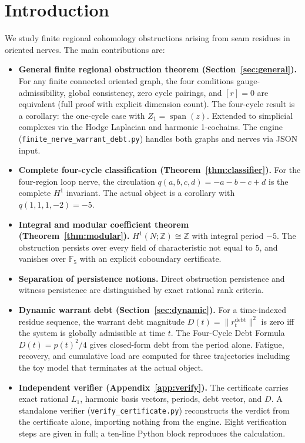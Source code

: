 \documentclass[11pt]{article}
\begin{document}
\section{Introduction}
We study finite regional cohomology obstructions arising from seam residues in
oriented nerves. The main contributions are:
\begin{itemize}
  \item \textbf{General finite regional obstruction theorem
    (Section~\ref{sec:general}).}
    For any finite connected oriented graph, the four conditions
    gauge-admissibility, global consistency, zero cycle pairings, and $[r]=0$
    are equivalent (full proof with explicit dimension count). The four-cycle
    result is a corollary: the one-cycle case with $Z_1=\operatorname{span}(z)$.
    Extended to simplicial complexes via the Hodge Laplacian and harmonic
    1-cochains. The engine (\texttt{finite\_nerve\_warrant\_debt.py}) handles
    both graphs and nerves via JSON input.
  \item \textbf{Complete four-cycle classification (Theorem~\ref{thm:classifier}).}
    For the four-region loop nerve, the circulation $q(a,b,c,d)=-a-b-c+d$ is
    the complete $H^1$ invariant. The actual object is a corollary with
    $q(1,1,1,-2)=-5$.
  \item \textbf{Integral and modular coefficient theorem (Theorem~\ref{thm:modular}).}
    $H^1(N;\mathbb{Z})\cong\mathbb{Z}$ with integral period $-5$. The obstruction
    persists over every field of characteristic not equal to $5$, and vanishes
    over $\mathbb{F}_5$ with an explicit coboundary certificate.
  \item \textbf{Separation of persistence notions.} Direct obstruction persistence
    and witness persistence are distinguished by exact rational rank criteria.
  \item \textbf{Dynamic warrant debt (Section~\ref{sec:dynamic}).}
    For a time-indexed residue sequence, the warrant debt magnitude
    $D(t)=\|r_t^{\mathrm{debt}}\|^2$ is zero iff the system is globally
    admissible at time $t$. The Four-Cycle Debt Formula $D(t)=p(t)^2/4$ gives
    closed-form debt from the period alone. Fatigue, recovery, and cumulative
    load are computed for three trajectories including the toy model that
    terminates at the actual object.
  \item \textbf{Independent verifier (Appendix~\ref{app:verify}).}
    The certificate carries exact rational $L_1$, harmonic basis vectors,
    periods, debt vector, and $D$. A standalone verifier (\texttt{verify\_certificate.py})
    reconstructs the verdict from the certificate alone, importing nothing from
    the engine. Eight verification steps are given in full; a ten-line Python
    block reproduces the calculation.
\end{itemize}
\end{document}
